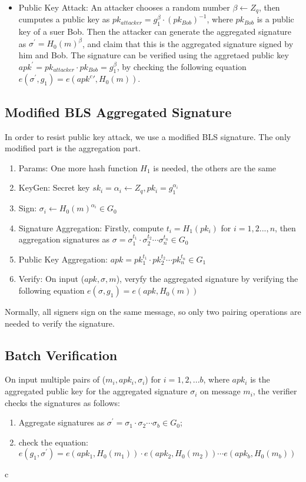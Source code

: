 \documentclass[12pt]{report}
\begin{document}
\begin{itemize}
	\item{Public Key Attack:} An attacker chooses a random number $\beta \leftarrow Z_{q}$, then cumputes a public key as $pk_{attacker}=g_{1}^{\beta}\cdot (pk_{Bob})^{-1}$, where $pk_{Bob}$ is a public key of a suer Bob. Then the attacker can generate the aggregated signature as $\sigma^{'}=H_{0}(m)^{\beta}$, and claim that this is the aggregated signature signed by him and Bob. The signature can be verified using the aggretaed public key $apk^{'}=pk_{attacker} \cdot pk_{Bob}=g_{1}^\beta$, by checking the following equation $e(\sigma^{'}, g_{1})=e(apk^c{'},H_{0}(m))$. 
\end{itemize}

\subsection{Modified BLS Aggregated Signature}
In order to resist public key attack, we use a modified BLS signature. The only modified part is the aggregation part.
\begin{enumerate}
	\item{Params:} One more hash function $H_{1}$ is needed, the others are the same
	\item{KeyGen:} Secret key $sk_{i}=\alpha_{i}\leftarrow Z_{q}, pk_{i}=g_{1}^{\alpha_{i}}$
	\item{Sign:} $\sigma_{i} \leftarrow H_{0}(m)^{\alpha_{i}} \in G_{0}$
	\item{Signature Aggregation:} Firstly, compute $t_{i}=H_{1}(pk_{i})$ for $i=1,2...,n$, then aggregation signatures as $\sigma=\sigma_{1}^{t_1} \cdot \sigma_{2}^{t_2} \cdots \sigma_{n}^{t_n} \in G_{0}$
	\item{Public Key Aggregation:} $apk=pk_{1}^{t_1} \cdot pk_{2}^{t_2} \cdots pk_{n}^{t_n} \in G_{1}$
	\item{Verify:} On input ($apk,\sigma, m$), veryfy the aggregated signature by verifying the following equation $e(\sigma, g_{1})=e(apk,H_{0}(m))$
\end{enumerate}
Normally, all signers sign on the same message, so only two pairing operations are needed to verify the signature.

\subsection{Batch Verification}
On input multiple pairs of ($m_{i},apk_{i},\sigma_{i}$) for $i=1,2,...b$, where $apk_{i}$ is the aggregated public key for the aggregated signature $\sigma_{i}$ on message $m_{i}$, the verifier checks the signatures as follows:
\begin{enumerate}
	\item Aggregate signatures as $\sigma^{'}=\sigma_{1} \cdot \sigma_{2} \cdots \sigma_{b} \in G_{0}$;
	\item check the equation: $e(g_{1}, \sigma^{'})=e(apk_{1},H_{0}(m_{1}))\cdot e(apk_{2}, H_{0}(m_{2})) \cdots e(apk_{b}, H_{0}(m_{b}))$
\end{enumerate}c
\end{document}
